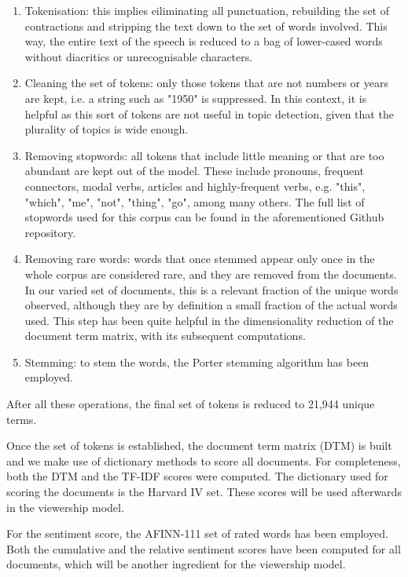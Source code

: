 \documentclass[a4paper, 11pt]{article} %
\begin{document}
\begin{enumerate}
\item Tokenisation: this implies eiliminating all punctuation, rebuilding the set of contractions and stripping the text down to the set of words involved. This way, the entire text of the speech is reduced to a bag of lower-cased words without diacritics or unrecognisable characters.
\item Cleaning the set of tokens: only those tokens that are not numbers or years are kept, i.e. a string such as "1950" is suppressed. In this context, it is helpful as this sort of tokens are not useful in topic detection, given that the plurality of topics is wide enough.
\item Removing stopwords: all tokens that include little meaning or that are too abundant are kept out of the model. These include pronouns, frequent connectors, modal verbs, articles and highly-frequent verbs, e.g. "this", "which", "me", "not", "thing", "go", among many others. The full list of stopwords used for this corpus can be found in the aforementioned Github repository.
\item Removing rare words: words that once stemmed appear only once in the whole corpus are considered rare, and they are removed from the documents. In our varied set of documents, this is a relevant fraction of the unique words observed, although they are by definition a small fraction of the actual words used. This step has been quite helpful in the dimensionality reduction of the document term matrix, with its subsequent computations.
\item Stemming: to stem the words, the Porter stemming algorithm has been employed.
\end{enumerate}

After all these operations, the final set of tokens is reduced to 21,944 unique terms.

Once the set of tokens is established, the document term matrix (DTM) is built and we make use of dictionary methods to score all documents. For completeness, both the DTM and the TF-IDF scores were computed. The dictionary used for scoring the documents is the Harvard IV set. These scores will be used afterwards in the viewership model.

For the sentiment score, the AFINN-111 set of rated words has been employed. Both the cumulative and the relative sentiment scores have been computed for all documents, which will be another ingredient for the viewership model.
\end{document}
